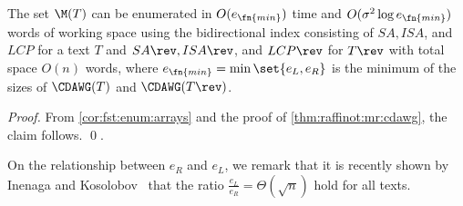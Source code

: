 \begin{theorem} \label{thm:fst:enum:emin:bidirectional}
The set $\M(T)$ can be enumerated in $O(e_\fn{min})$ time and $O(\sigma^2\log e_\fn{min})$ words of working space using the bidirectional index consisting of 
$SA, ISA$, and $LCP$ for a text $T$ and $SA\rev, ISA\rev$, and $LCP\rev$ for $T\rev$ with total space $O(n)$ words, where $e_\fn{min} = \min\set{e_L, e_R}$ is the minimum of the sizes of $\CDAWG(T)$ and $\CDAWG(T\rev)$. 
\end{theorem}

\begin{proof}
From \cref{cor:fst:enum:arrays} and the proof of \cref{thm:raffinot:mr:cdawg}, the claim follows. \qed. 
\end{proof}

On the relationship between $e_R$ and $e_L$, we remark that it is recently shown by Inenaga and Kosolobov~\cite{inenaga:kosolobov2024relating:left:right} that the ratio $\frac{e_L}{e_R}=\Theta(\sqrt n)$ hold for all texts. 


  






